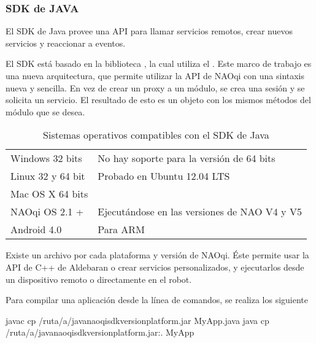 \subsubsection{SDK de JAVA}
\label{\detokenize{chapter_one/naoqi:sdk-de-java}}
El SDK de Java provee una API para llamar servicios remotos, crear nuevos
servicios y reaccionar a eventos.

El SDK está basado en la biblioteca , la cual utiliza el
. Este marco de trabajo es 
una nueva arquitectura, que permite utilizar la API de NAOqi con 
una sintaxis nueva y sencilla.
En vez de crear un proxy a un módulo, se crea una sesión y se 
solicita un servicio. El resultado de esto es un objeto con los 
mismos métodos del módulo que se desea.



\begin{table}
\centering
\caption{Sistemas operativos compatibles con el SDK de Java}
\begin{tabulary}{\linewidth}[t]{|T|T|}
\hline
{}\relax &\relax \\
\hline
Windows 32 bits
&
No hay soporte para la versión de 64 bits
\\
\hline
Linux 32 y 64 bit
&
Probado en Ubuntu 12.04 LTS
\\
\hline
Mac OS X 64 bits
&\\
\hline
NAOqi OS 2.1 +
&
Ejecutándose en las versiones de NAO V4 y V5
\\
\hline
Android 4.0
&
Para ARM
\\
\hline
\end{tabulary}
\end{table}

Existe un archivo  por cada plataforma y versión de NAOqi. Éste
permite usar la API de C++ de Aldebaran o crear servicios
personalizados, y ejecutarlos desde un dispositivo remoto o directamente en el
robot.

Para compilar una aplicación desde la línea de comandos, se realiza los
siguiente

\begin{sphinxVerbatim}[commandchars=\\\{\}]
javac \PYGZhy{}cp /ruta/a/java\PYGZhy{}naoqi\PYGZhy{}sdk\PYGZhy{}\PYGZlt{}version\PYGZgt{}\PYGZhy{}\PYGZlt{}platform\PYGZgt{}.jar MyApp.java
java \PYGZhy{}cp /ruta/a/java\PYGZhy{}naoqi\PYGZhy{}sdk\PYGZhy{}\PYGZlt{}version\PYGZgt{}\PYGZhy{}\PYGZlt{}platform\PYGZgt{}.jar:. MyApp
\end{sphinxVerbatim}

